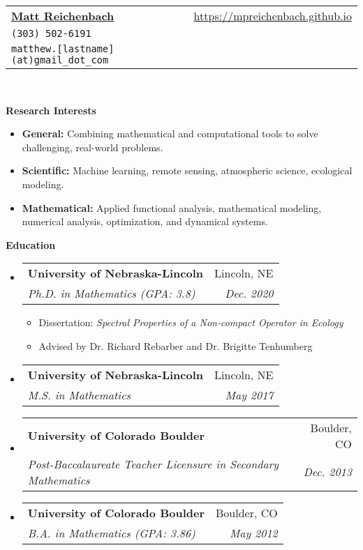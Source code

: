 \documentclass[letterpaper,11pt]{article}
\makeatletter
\newcommand{\resitem}[1]{\item #1 \vspace{-2pt}}
\newcommand{\resheading}[1]{{\large \colorbox{mygrey}{\begin{minipage}{\textwidth}{\textbf{#1 \vphantom{p\^{E}}}}\end{minipage}}}}
\newcommand{\ressubheading}[4]{
\begin{tabular*}{6.5in}{l@{\extracolsep{\fill}}r}
		\textbf{#1} & #2 \\
		\textit{#3} & \textit{#4} \\
\end{tabular*}\vspace{-6pt}}
\makeatother
\begin{document}
\thispagestyle{empty}
\newcommand{\mywebheader}{
\begin{tabular*}{7in}{l@{\extracolsep{\fill}}r}
	\textbf{\href{}{\LARGE Matt Reichenbach}} & \url{https://mpreichenbach.github.io} \\
    \texttt{(303) 502-6191} \\
    \texttt{matthew.[lastname](at)gmail\_dot\_com} \\
	\end{tabular*}
\\
\vspace{0.1in}}

\mywebheader

\resheading{Research Interests}
\begin{itemize}
	\resitem{\textbf{General:} Combining mathematical and computational tools to solve challenging, real-world problems.}
	
	\resitem{\textbf{Scientific:} Machine learning, remote sensing, atmospheric science, ecological modeling.}
	
	\resitem{\textbf{Mathematical:} Applied functional analysis, mathematical modeling, numerical analysis, optimization, and dynamical systems.}
	
	
\end{itemize}

\resheading{Education}
	\begin{itemize}
		\item
			\ressubheading{University of Nebraska-Lincoln}{Lincoln, NE}{Ph.D. in Mathematics (GPA: 3.8)}{Dec. 2020}
				{ \footnotesize
				\begin{itemize}
					\resitem{Dissertation: \emph{Spectral Properties of a Non-compact Operator in Ecology}}
					\resitem{Advised by Dr. Richard Rebarber and Dr. Brigitte Tenhumberg}
				\end{itemize}}
		\item
		    	\ressubheading{University of Nebraska-Lincoln}{Lincoln, NE}{M.S. in Mathematics}{May 2017}
		\item
			\ressubheading{University of Colorado Boulder}{Boulder, CO}{Post-Baccalaureate Teacher Licensure in Secondary Mathematics}{Dec. 2013}
		\item
			\ressubheading{University of Colorado Boulder}{Boulder, CO}{B.A. in Mathematics (GPA: 3.86)}{May 2012}
			
	\end{itemize}
\end{document}

